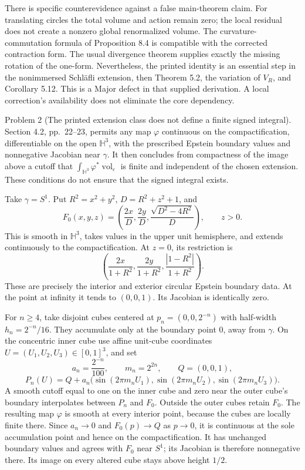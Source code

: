 \documentclass[10pt]{article}
\begin{document}
There is specific counterevidence against a false main-theorem claim. For translating circles the total volume and action remain zero; the local residual does not create a nonzero global renormalized volume. The curvature-commutation formula of Proposition 8.4 is compatible with the corrected contraction form. The usual divergence theorem supplies exactly the missing rotation of the one-form. Nevertheless, the printed identity is an essential step in the nonimmersed Schläfli extension, then Theorem 5.2, the variation of \(V_R\), and Corollary 5.12. This is a Major defect in that supplied derivation. A local correction’s availability does not eliminate the core dependency.\par
Problem 2 (The printed extension class does not define a finite signed integral).  Section 4.2, pp. 22–23, permits any map \(\varphi\) continuous on the compactification, differentiable on the open \(\mathbb H^3\), with the prescribed Epstein boundary values and nonnegative Jacobian near \(\gamma\). It then concludes from compactness of the image above a cutoff that \(\int_{\mathbb H^3}\varphi^*\operatorname{vol}_\varepsilon\) is finite and independent of the chosen extension. These conditions do not ensure that the signed integral exists.\par
Take \(\gamma=S^1\). Put \(R^2=x^2+y^2\), \(D=R^2+z^2+1\), and \[F_0(x,y,z)=
 \left(\frac{2x}{D},\frac{2y}{D},
       \frac{\sqrt{D^2-4R^2}}{D}\right),\qquad z>0 .\] This is smooth in \(\mathbb H^3\), takes values in the upper unit hemisphere, and extends continuously to the compactification. At \(z=0\), its restriction is \[\left(\frac{2x}{1+R^2},\frac{2y}{1+R^2},
       \frac{|1-R^2|}{1+R^2}\right).\] These are precisely the interior and exterior circular Epstein boundary data. At the point at infinity it tends to \((0,0,1)\). Its Jacobian is identically zero.\par
For \(n\geq4\), take disjoint cubes centered at \(p_n=(0,0,2^{-n})\) with half-width \(h_n=2^{-n}/16\). They accumulate only at the boundary point \(0\), away from \(\gamma\). On the concentric inner cube use affine unit-cube coordinates \(U=(U_1,U_2,U_3)\in[0,1]^3\), and set \[a_n=\frac{2^{-n}}{100},\qquad m_n=2^{2n},\qquad Q=(0,0,1),\] \[P_n(U)=Q+a_n
 \bigl(\sin(2\pi m_nU_1),\sin(2\pi m_nU_2),\sin(2\pi m_nU_3)\bigr).\] A smooth cutoff equal to one on the inner cube and zero near the outer cube’s boundary interpolates between \(P_n\) and \(F_0\). Outside the outer cubes retain \(F_0\). The resulting map \(\varphi\) is smooth at every interior point, because the cubes are locally finite there. Since \(a_n\to0\) and \(F_0(p)\to Q\) as \(p\to0\), it is continuous at the sole accumulation point and hence on the compactification. It has unchanged boundary values and agrees with \(F_0\) near \(S^1\); its Jacobian is therefore nonnegative there. Its image on every altered cube stays above height \(1/2\).\par
\end{document}
